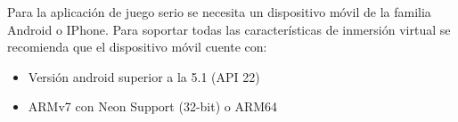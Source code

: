 Para la aplicación de juego serio se necesita un dispositivo móvil de la familia Android o IPhone. Para soportar todas las características de inmersión virtual se recomienda que el dispositivo móvil cuente con:
\begin{itemize}
    \item Versión android superior a la 5.1 (API 22)
    \item ARMv7 con Neon Support (32-bit) o ARM64
\end{itemize}

